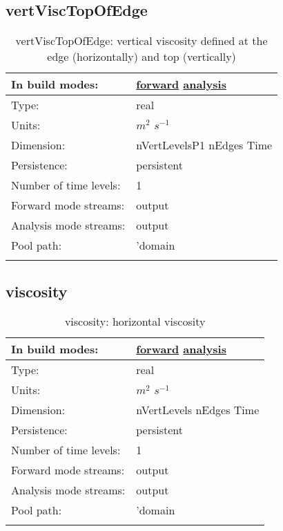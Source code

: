 \subsection[vertViscTopOfEdge]{vertViscTopOfEdge}
\label{subsec:var_sec_diagnostics_vertViscTopOfEdge}
\begin{center}
\begin{longtable}{| p{2.0in} | p{4.0in} |}
        \hline 
        In build modes: & \hyperref[subsec:forward_var_tab_diagnostics]{forward} \hyperref[subsec:analysis_var_tab_diagnostics]{analysis} \\
        \hline 
        Type: & real \\
        \hline 
        Units: & $m^2$ $s^{-1}$ \\
        \hline 
        Dimension: & nVertLevelsP1 nEdges Time \\
        \hline 
        Persistence: & persistent \\
        \hline 
        Number of time levels: & 1 \\
        \hline 
		 Forward mode streams: &  output \\
        \hline 
		 Analysis mode streams: &  output \\
        \hline 
            Pool path: & 'domain %
 \\
		 \hline 
    \caption{vertViscTopOfEdge: vertical viscosity defined at the edge (horizontally) and top (vertically)}
\end{longtable}
\end{center}
\subsection[viscosity]{viscosity}
\label{subsec:var_sec_diagnostics_viscosity}
\begin{center}
\begin{longtable}{| p{2.0in} | p{4.0in} |}
        \hline 
        In build modes: & \hyperref[subsec:forward_var_tab_diagnostics]{forward} \hyperref[subsec:analysis_var_tab_diagnostics]{analysis} \\
        \hline 
        Type: & real \\
        \hline 
        Units: & $m^2$ $s^{-1}$ \\
        \hline 
        Dimension: & nVertLevels nEdges Time \\
        \hline 
        Persistence: & persistent \\
        \hline 
        Number of time levels: & 1 \\
        \hline 
		 Forward mode streams: &  output \\
        \hline 
		 Analysis mode streams: &  output \\
        \hline 
            Pool path: & 'domain %
 \\
		 \hline 
    \caption{viscosity: horizontal viscosity}
\end{longtable}
\end{center}
